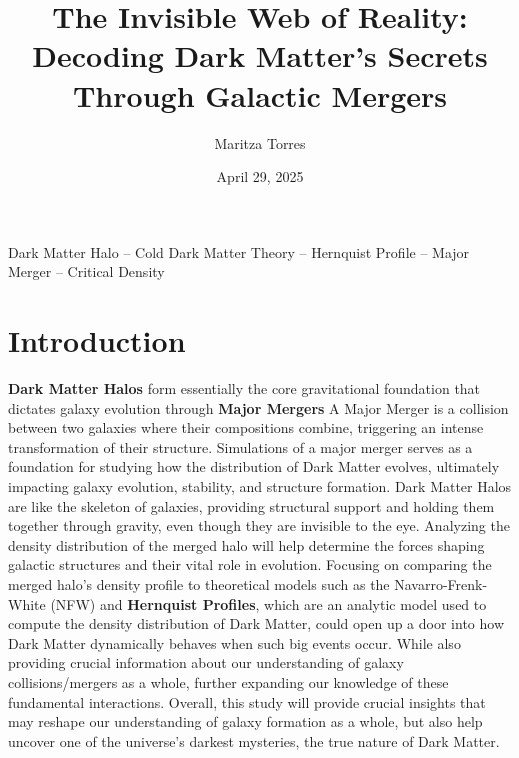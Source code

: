 \documentclass[fleqn,usenatbib]{mnras}
\title {The Invisible Web of Reality: Decoding Dark Matter's Secrets Through Galactic Mergers}
\author {Maritza Torres}
\date{April 29, 2025}
\begin{document}
\label{firstpage}
\pagerange{\pageref{firstpage}--\pageref{lastpage}}
\maketitle


\begin{keywords}
Dark Matter Halo -- Cold Dark Matter Theory -- Hernquist Profile -- Major Merger -- Critical Density  
\end{keywords} 

\section{Introduction}

 \textbf{Dark Matter Halos} form essentially the core gravitational foundation that dictates galaxy evolution through \textbf{Major Mergers} \citep{2019MNRAS.487..993D} A Major Merger is a collision between two galaxies where their compositions combine, triggering an intense transformation of their structure. Simulations of a major merger serves as a foundation for studying how the distribution of Dark Matter evolves, ultimately impacting galaxy evolution, stability, and structure formation. Dark Matter Halos are like the skeleton of galaxies, providing structural support and holding them together through gravity, even though they are invisible to the eye. Analyzing the density distribution of the merged halo will help determine the forces shaping galactic structures and their vital role in evolution. Focusing on comparing the merged halo’s density profile to theoretical models such as the Navarro-Frenk-White (NFW) and \textbf{Hernquist Profiles}, which are an analytic model used to compute the density distribution of Dark Matter, could open up a door into how Dark Matter dynamically behaves when such big events occur. While also providing crucial information about our understanding of galaxy collisions/mergers as a whole, further expanding our knowledge of these fundamental interactions. Overall, this study will provide crucial insights that may reshape our understanding of galaxy formation as a whole, but also help uncover one of the universe's darkest mysteries, the true nature of Dark Matter.
 
\end{document}
